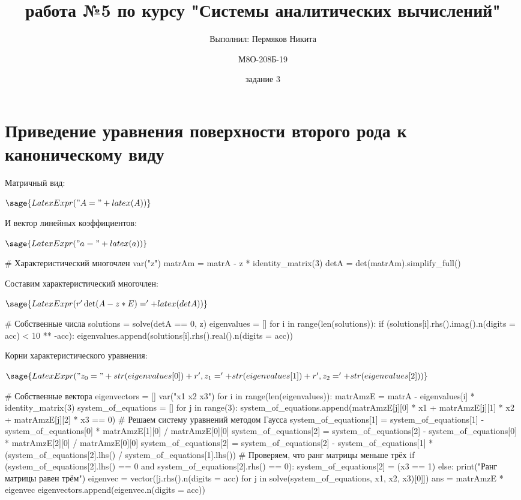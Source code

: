 \documentclass[14pt, a4paper]{article}
\title{\quad\quad\quad\quadЛабораторная работа №5 по курсу
\newline "Системы аналитических вычислений"}
\author{Выполнил: Пермяков Никита
\and М8О-208Б-19
\and задание 3}
\begin{document}
\maketitle

\section{Приведение уравнения поверхности второго рода к каноническому виду}


Матричный вид:

$\sage{LatexExpr("A = " + latex(A))}$

И вектор линейных коэффициентов:

$\sage{LatexExpr("a = " + latex(a))}$

\begin{sagesilent}
    # Характеристический многочлен
    var("z")
    matrAm = matrA - z * identity_matrix(3)
    detA = det(matrAm).simplify_full()
\end{sagesilent}

Составим характеристический многочлен:

$\sage{LatexExpr(r'\det(A - z * E) = ' + latex(detA))}$

\begin{sagesilent}
    # Собственные числа
    solutions = solve(detA == 0, z)
    eigenvalues = []
    for i in range(len(solutions)):
        if (solutions[i].rhs().imag().n(digits = acc) < 10 ** -acc):
            eigenvalues.append(solutions[i].rhs().real().n(digits = acc))
\end{sagesilent}

Корни характеристического уравнения:

$\sage{LatexExpr("z_0 = " + str(eigenvalues[0]) + r', z_1 = ' + str(eigenvalues[1]) + r', z_2 = ' + str(eigenvalues[2]))}$

\begin{sagesilent}
    # Собственные вектора
    eigenvectors = []
    var("x1 x2 x3")
    for i in range(len(eigenvalues)):
        matrAmzE = matrA - eigenvalues[i] * identity_matrix(3)
        system_of_equations = []
        for j in range(3):
            system_of_equations.append(matrAmzE[j][0] * x1 + matrAmzE[j][1] * x2 + matrAmzE[j][2] * x3 == 0)
        # Решаем систему уравнений методом Гаусса
        system_of_equations[1] = system_of_equations[1] - system_of_equations[0] * matrAmzE[1][0] / matrAmzE[0][0]
        system_of_equations[2] = system_of_equations[2] - system_of_equations[0] * matrAmzE[2][0] / matrAmzE[0][0]
        system_of_equations[2] = system_of_equations[2] - system_of_equations[1] * (system_of_equations[2].lhs() / system_of_equations[1].lhs())
        # Проверяем, что ранг матрицы меньше трёх
        if (system_of_equations[2].lhs() == 0 and system_of_equations[2].rhs() == 0):
            system_of_equations[2] = (x3 == 1)
        else:
            print("Ранг матрицы равен трём")
        eigenvec = vector([j.rhs().n(digits = acc) for j in solve(system_of_equations, x1, x2, x3)[0]])
        ans = matrAmzE * eigenvec
        eigenvectors.append(eigenvec.n(digits = acc))
\end{sagesilent}
\end{document}
